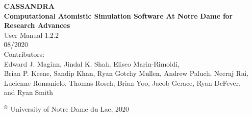 \begin{center}
\vspace*{2 in}
{\huge{\bf CASSANDRA} }\\
\vspace{0.5in}
{\huge { \bf  Computational Atomistic Simulation Software At Notre Dame for Research Advances}} \\
\vspace{1 in}
User Manual 1.2.2 \\
\vspace{.2 in}
08/2020 \\
\vspace{0.2in}
Contributors: \\
\vspace{0.2in}
Edward J. Maginn, Jindal K. Shah, Eliseo Marin-Rimoldi, \\
Brian P. Keene, Sandip Khan, Ryan Gotchy Mullen, Andrew Paluch,
Neeraj Rai, Lucienne Romanielo, Thomas Rosch, Brian Yoo, Jacob Gerace, Ryan DeFever, and Ryan Smith
\end{center}
\vspace{1.0in}
$^\copyright$ University of Notre Dame du Lac, 2020
